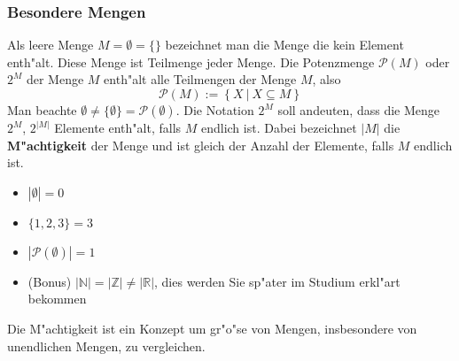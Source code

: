 \subsubsection{Besondere Mengen}
Als leere Menge $M = \emptyset = \{\}$ bezeichnet man die Menge die kein Element enth"alt. Diese Menge ist Teilmenge jeder Menge. Die Potenzmenge $\mathcal{P}(M)$ oder $2^M$ der Menge $M$ enth"alt alle Teilmengen der Menge $M$, also
\begin{equation*}
\mathcal{P}(M) := \left\{X \ | \ X \subseteq M \right\}
\end{equation*}
Man beachte $\emptyset \neq \{ \emptyset \} = \mathcal{P}(\emptyset)$. Die Notation $2^M$ soll andeuten, dass die Menge $2^M$, $2^{|M|}$ Elemente enth"alt, falls $M$ endlich ist. Dabei bezeichnet $|M|$ die \textbf{M"achtigkeit} der Menge und ist gleich der Anzahl der Elemente, falls $M$ endlich ist.
\begin{itemize}
\item $|\emptyset| = 0$
\item $\{1, 2, 3\} = 3$
\item $|\mathcal{P}(\emptyset)| = 1$
\item (Bonus) $|\mathbb{N}| = |\mathbb{Z}| \neq |\mathbb{R}|$, dies werden Sie sp"ater im Studium erkl"art bekommen
\end{itemize}
 Die M"achtigkeit ist ein Konzept um gr"o"se von Mengen, insbesondere von unendlichen Mengen, zu vergleichen.